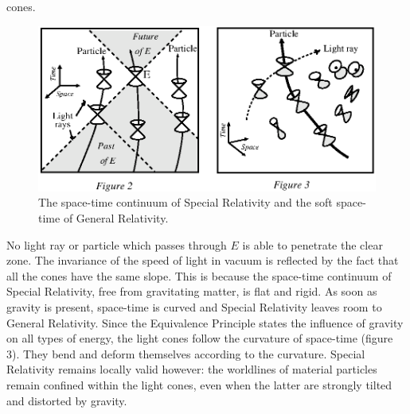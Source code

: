 \documentclass[12pt]{article}
\begin{document}
cones.
\begin{figure}[htb]
\renewcommand \thefigure {2\&3}
  \begin{center}
    \leavevmode
    \includegraphics{spacetime.ps} 
    \caption{The space-time continuum of Special Relativity and
             the soft space-time of General Relativity.}
\end{center}
\end{figure}
\setcounter{figure}{3}
No light ray or particle which passes through $E$ is able to penetrate the
clear zone. The invariance of the speed of light in vacuum is
reflected by the fact that all the  cones have the same slope. This is because
the space-time continuum of Special Relativity, free from gravitating matter,
is flat and rigid. As soon as gravity is present,
space-time is curved and Special Relativity leaves room to General Relativity.
Since the 
Equivalence Principle
states the influence of gravity on all types of energy,
the light cones follow the curvature of space-time (figure 3). They bend
and deform themselves according to the curvature. Special Relativity
remains locally valid however: the worldlines of material
particles remain confined within the light cones, even when the latter are
strongly tilted and distorted by gravity. 
\end{document}
